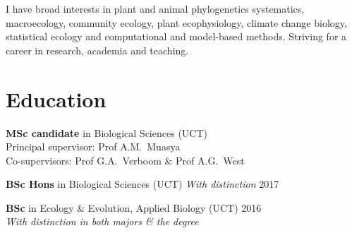 \documentclass[10pt]{article}
\begin{document}


\bigskip

I have broad interests in plant and animal phylogenetics systematics, 
macroecology, community ecology, plant ecophysiology, climate change biology, 
statistical ecology and computational and model-based methods. Striving for a 
career in research, academia and teaching.

\bigskip






\hrulefill

\section*{Education} %

\begin{hangparas}{2em}{1}

  \textbf{MSc candidate} in Biological Sciences
    {\small (UCT)                                                             \\
    \hspace{2em} Principal supervisor: Prof A.M.~Muasya                       \\
    \hspace{2em} Co-supervisors: Prof G.A.~Verboom \& Prof A.G.~West}
  
  \textbf{BSc Hons} in Biological Sciences
    {\small (UCT) \textit{With distinction}                       \hfill 2017}
  
  \textbf{BSc} in Ecology \& Evolution, Applied Biology
    {\small (UCT)                                                 \hfill 2016 \\
    \hspace{2em} \textit{With distinction in both majors \& the degree}}
  
  \end{hangparas}
\end{document}

